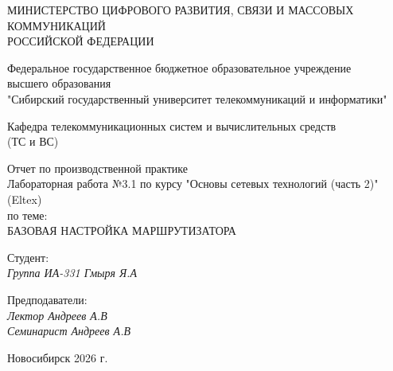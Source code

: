 \thispagestyle{empty}

\begin{center}
    МИНИСТЕРСТВО ЦИФРОВОГО РАЗВИТИЯ, СВЯЗИ И МАССОВЫХ КОММУНИКАЦИЙ \\ РОССИЙСКОЙ ФЕДЕРАЦИИ

    \vspace{20pt}

    Федеральное государственное бюджетное образовательное учреждение  \\  высшего образования \\
    "Сибирский государственный университет телекоммуникаций и информатики" \\

    \vspace{20pt}

    Кафедра телекоммуникационных систем и вычислительных средств \\  (ТС и ВС)
\end{center}

\vfill

\begin{center}
    Отчет по производственной практике \\  
    Лабораторная работа №3.1 по курсу "Основы сетевых технологий (часть 2)" (Eltex) \\
    \vspace{20pt}
    по теме: \\
    \uppercase{Базовая настройка маршрутизатора}
\end{center}

\vfill

    \noindent Студент: \\
    \textit{Группа ИА-331 \hfill Гмыря Я.А} 

    \vspace{20pt}
 
    \noindent Предподаватели: \\
    \textit{Лектор \hfill Андреев А.В} \\
    \textit{Семинарист \hfill Андреев А.В}

\vfill

\begin{center}
    Новосибирск 2026 г.
\end{center}